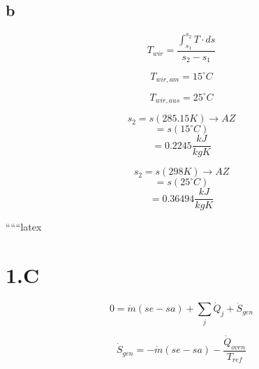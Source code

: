 

\subsection*{b}
\begin{equation*}
T_{wir} = \frac{\int_{s_1}^{s_2} T \cdot ds}{s_2 - s_1}
\end{equation*}

\begin{equation*}
T_{wir, am} = 15^\circ C
\end{equation*}

\begin{equation*}
T_{wir, aus} = 25^\circ C
\end{equation*}

\begin{equation*}
s_2 = s (285.15 K) \rightarrow AZ
\end{equation*}
\begin{equation*}
= s (15^\circ C)
\end{equation*}
\begin{equation*}
= 0.2245 \frac{kJ}{kgK}
\end{equation*}

\begin{equation*}
s_2 = s (298 K) \rightarrow AZ
\end{equation*}
\begin{equation*}
= s (25^\circ C)
\end{equation*}
\begin{equation*}
= 0.36494 \frac{kJ}{kgK}
\end{equation*}

``````latex


\section*{1.C}
\begin{equation*}
0 = \dot{m} (se - sa) + \sum_{j} \dot{Q}_j + \dot{S}_{gen}
\end{equation*}

\begin{equation*}
\dot{S}_{gen} = - \dot{m} (se - sa) - \frac{\dot{Q}_{oven}}{T_{ref}}
\end{equation*}